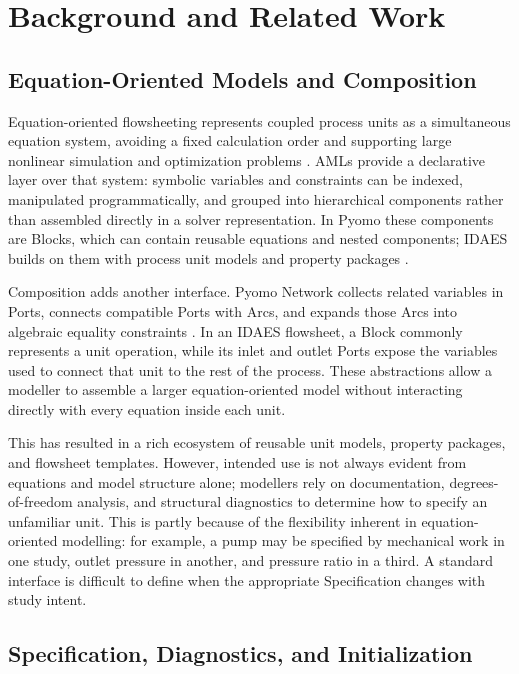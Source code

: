 \documentclass[10pt,letterpaper]{article}
\begin{document}
\section{Background and Related Work}
\subsection{Equation-Oriented Models and Composition}
Equation-oriented flowsheeting represents coupled process units as a simultaneous equation system, avoiding a fixed calculation order and supporting large nonlinear simulation and optimization problems \cite{shacham1982equation,biegler2010nonlinear,dowling2015framework}. AMLs provide a declarative layer over that system: symbolic variables and constraints can be indexed, manipulated programmatically, and grouped into hierarchical components rather than assembled directly in a solver representation. In Pyomo these components are Blocks, which can contain reusable equations and nested components; IDAES builds on them with process unit models and property packages \cite{hart2011pyomo,lee2021idaes}.

Composition adds another interface. Pyomo Network collects related variables in Ports, connects compatible Ports with Arcs, and expands those Arcs into algebraic equality constraints \cite{pyomoNetworkDocs}. In an IDAES flowsheet, a Block commonly represents a unit operation, while its inlet and outlet Ports expose the variables used to connect that unit to the rest of the process. These abstractions allow a modeller to assemble a larger equation-oriented model without interacting directly with every equation inside each unit.

This has resulted in a rich ecosystem of reusable unit models, property packages, and flowsheet templates. However, intended use is not always evident from equations and model structure alone; modellers rely on documentation, degrees-of-freedom analysis, and structural diagnostics to determine how to specify an unfamiliar unit. This is partly because of the flexibility inherent in equation-oriented modelling: for example, a pump may be specified by mechanical work in one study, outlet pressure in another, and pressure ratio in a third. A standard interface is difficult to define when the appropriate Specification changes with study intent.

\subsection{Specification, Diagnostics, and Initialization}
\end{document}
